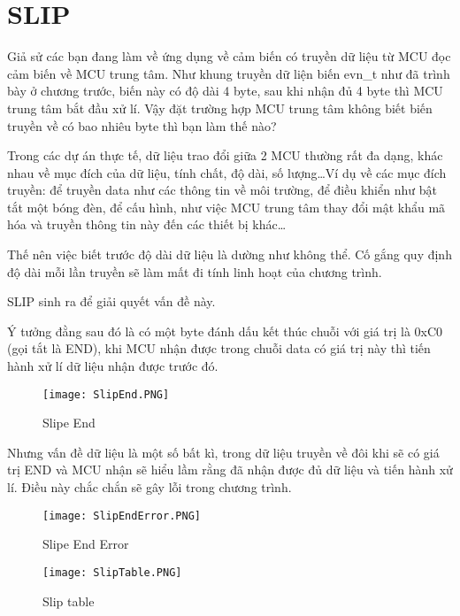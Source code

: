 \newpage
\section{SLIP}

Giả sử các bạn đang làm về ứng dụng về cảm biến có truyền dữ liệu từ MCU đọc cảm biến về MCU trung tâm. Như khung truyền dữ liện biến evn\_t như đã trình bày ở chương trước, biến này có độ dài 4 byte, sau khi nhận đủ 4 byte thì MCU trung tâm bắt đầu xử lí. Vậy đặt trường hợp MCU trung tâm không biết biến truyền về có bao nhiêu byte thì bạn làm thế nào?

Trong các dự án thực tế, dữ liệu trao đổi giữa 2 MCU thường rất đa dạng, khác nhau về mục đích của dữ liệu, tính chất, độ dài, số lượng\dots Ví dụ về các mục đích truyền: để truyền data như các thông tin về môi trường, để điều khiển như bật tắt một bóng đèn, để cấu hình, như việc MCU trung tâm thay đổi mật khẩu mã hóa và truyền thông tin này đến các thiết bị khác\dots

Thế nên việc biết trước độ dài dữ liệu là dường như không thể. Cố gắng quy định độ dài mỗi lần truyền sẽ làm mất đi tính linh hoạt của chương trình. 

SLIP sinh ra để giải quyết vấn đề này.

Ý tưởng đằng sau đó là có một byte đánh dấu kết thúc chuỗi với giá trị là 0xC0 (gọi tắt là END), khi MCU nhận được trong chuỗi data có giá trị này thì tiến hành xử lí dữ liệu nhận được trước đó.

\begin{wrapfigure}{l}{0.5\textwidth}
	\centering
    \texttt{[image: SlipEnd.PNG]}
\caption{Slipe End}
\end{wrapfigure}

Nhưng vấn đề dữ liệu là một số bất kì, trong dữ liệu truyền về đôi khi sẽ có giá trị END và MCU nhận sẽ hiểu lầm rằng đã nhận được đủ dữ liệu và tiến hành xử lí. Điều này chắc chắn sẽ gây lỗi trong chương trình.

\begin{wrapfigure}{l}{0.5\textwidth}
	\centering
    \texttt{[image: SlipEndError.PNG]}
\caption{Slipe End Error}
\end{wrapfigure}

\begin{wrapfigure}{l}{0.5\textwidth}
	\centering
    \texttt{[image: SlipTable.PNG]}
    \caption{Slip table}
    \label{SlipTable}
\end{wrapfigure}

